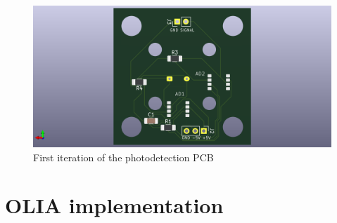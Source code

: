 \begin{figure}[ht]
	\centering
	\includegraphics[width=0.7\linewidth]{img/photodetec_og_pcb}
	\caption{First iteration of the photodetection PCB}
	\label{fig:photodetecogpcb}
\end{figure}


\section{OLIA implementation}
